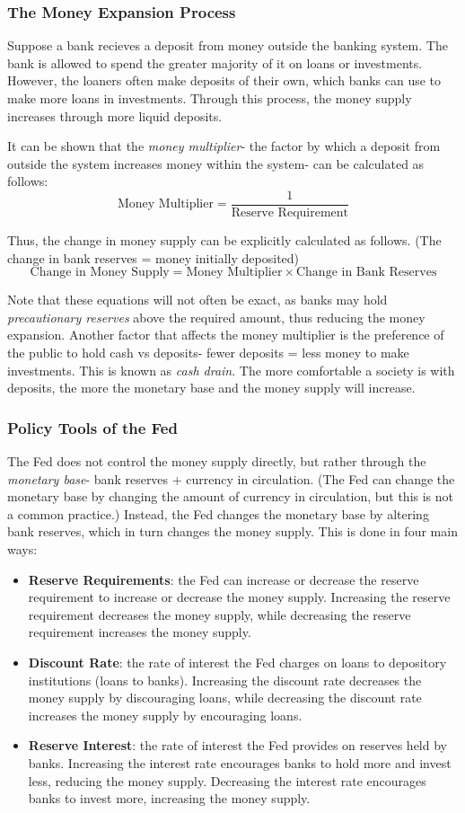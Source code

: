 \documentclass[12pt, a4paper]{article}
\theoremstyle{definition}
\begin{document}
\subsubsection{The Money Expansion Process}
Suppose a bank recieves a deposit from money outside the banking system.
The bank is allowed to spend the greater majority of it on loans or investments.
However, the loaners often make deposits of their own, which banks can use to make more loans in investments.
Through this process, the money supply increases through more liquid deposits.

It can be shown that the \textit{money multiplier}- the factor by which a deposit from outside the system increases money within the system- can be calculated as follows:
\[\textrm{Money Multiplier} = \frac{1}{\textrm{Reserve Requirement}}\]

Thus, the change in money supply can be explicitly calculated as follows.
(The change in bank reserves = money initially deposited)
\[\textrm{Change in Money Supply} = \textrm{Money Multiplier} \times \textrm{Change in Bank Reserves}\]

Note that these equations will not often be exact, as banks may hold \textit{precautionary reserves} above the required amount, thus reducing the money expansion.
Another factor that affects the money multiplier is the preference of the public to hold cash vs deposits- fewer deposits = less money to make investments.
This is known as \textit{cash drain}.
The more comfortable a society is with deposits, the more the monetary base and the money supply will increase.

\subsubsection{Policy Tools of the Fed}
The Fed does not control the money supply directly, but rather through the \textit{monetary base}- bank reserves + currency in circulation.
(The Fed can change the monetary base by changing the amount of currency in circulation, but this is not a common practice.)
Instead, the Fed changes the monetary base by altering bank reserves, which in turn changes the money supply.
This is done in four main ways:
\begin{itemize}
    \item \textbf{Reserve Requirements}: the Fed can increase or decrease the reserve requirement to increase or decrease the money supply. Increasing the reserve requirement decreases the money supply, while decreasing the reserve requirement increases the money supply.
    \item \textbf{Discount Rate}: the rate of interest the Fed charges on loans to depository institutions (loans to banks). Increasing the discount rate decreases the money supply by discouraging loans, while decreasing the discount rate increases the money supply by encouraging loans.
    \item \textbf{Reserve Interest}: the rate of interest the Fed provides on reserves held by banks. Increasing the interest rate encourages banks to hold more and invest less, reducing the money supply. Decreasing the interest rate encourages banks to invest more, increasing the money supply. 
\end{itemize}
\end{document}
